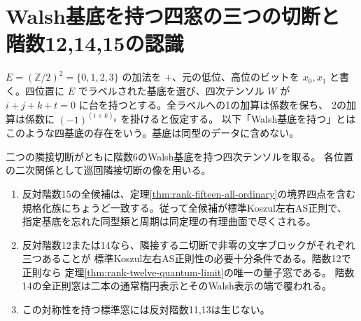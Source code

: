 \section{Walsh基底を持つ四窓の三つの切断と階数12,14,15の認識}
\label{sec:walsh-symmetric-windows}
$E=(\mathbb Z/2)^2=\{0,1,2,3\}$ の加法を $+$、元の低位、高位のビットを
$x_0,x_1$ と書く。四位置に $E$ でラベルされた基底を選び、四次テンソル $W$ が
$i+j+k+t=0$ に台を持つとする。全ラベルへの1の加算は係数を保ち、
2の加算は係数に $(-1)^{(i+k)_0}$ を掛けると仮定する。
以下「Walsh基底を持つ」とはこのような四基底の存在をいう。基底は同型のデータに含めない。
\begin{theorem}\label{thm:walsh-symmetric-windows}
二つの隣接切断がともに階数6のWalsh基底を持つ四次テンソルを取る。
各位置の二次関係として巡回隣接切断の像を用いる。
\begin{enumerate}
\item 反対階数15の全候補は、定理\ref{thm:rank-fifteen-all-ordinary}の境界四点を含む
規格化族にちょうど一致する。従って全候補が標準Koszul左右AS正則で、
指定基底を忘れた同型類と周期は同定理の有理曲面で尽くされる。
\item 反対階数12または14なら、隣接する二切断で非零の文字ブロックがそれぞれ三つあることが
標準Koszul左右AS正則性の必要十分条件である。階数12で正則なら
定理\ref{thm:rank-twelve-quantum-limit}の唯一の量子窓である。
階数14の全正則窓は二本の通常楕円表示とそのWalsh表示の端で覆われる。
\item この対称性を持つ標準窓には反対階数11,13は生じない。
\end{enumerate}
\end{theorem}
